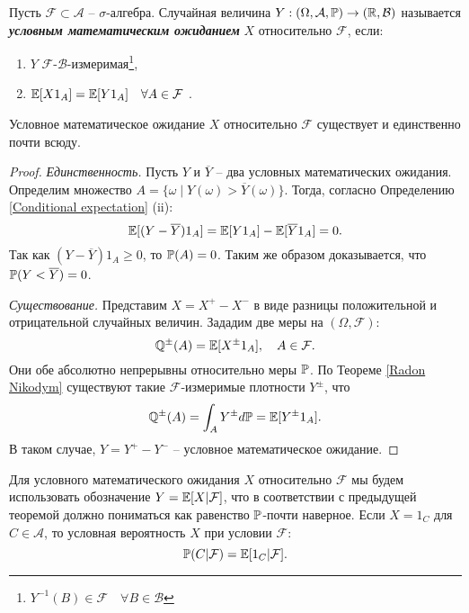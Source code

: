 \begin{defn}\label{Conditional expectation}
	Пусть $\mathcal{F} \subset \mathcal{A}$ -- $\sigma$-алгебра. Случайная величина $Y: (\Omega, \mathcal{A}, \mathbb{P}) \rightarrow (\mathbb{R}, \mathcal{B})$ называется \textbf{\textit{условным математическим ожиданием}} $X$ относительно $\mathcal{F}$, если:
	\begin{enumerate}
		\item $Y$ $\mathcal{F}$-$\mathcal{B}$-измеримая\footnote{$Y^{-1}(B) \in \mathcal{F} \quad \forall B \in \mathcal{B}$},
		\item $\mathbb{E}[X 1_{A}]=\mathbb{E}[Y 1_{A}] \quad \forall A \in \mathcal{F}$ .
	\end{enumerate}
\end{defn}

\begin{thm}\label{Existence and uniqueness of expectation}
	Условное математическое ожидание $X$ относительно $\mathcal{F}$ существует и единственно почти всюду.
\end{thm}

\begin{proof}
	\textit{Единственность.} Пусть $Y$ и $\overline{Y}$ -- два условных математических ожидания. Определим множество $A=\{\omega \mid Y(\omega) > \overline{Y}({\omega}) \}$. Тогда, согласно Определению \ref{Conditional expectation} (ii):
	\[\mathbb{E}[(Y-\overline{Y})1_A]=\mathbb{E}[Y1_A]-\mathbb{E}[\overline{Y}1_A]=0.   \]
	Так как $(Y-\overline{Y})1_A \geq 0$, то $\mathbb{P}(A)=0$. Таким же образом доказывается, что $\mathbb{P}(Y<\overline{Y})=0$.
	
	\textit{Существование.} Представим $X=X^+-X^-$ в виде разницы положительной и отрицательной случайных величин. Зададим две меры на $(\Omega, \mathcal{F})$:
	\[\mathbb{Q}^{\pm}(A)=\mathbb{E}[X^\pm 1_A],  \quad A \in \mathcal{F}.\]
	Они обе абсолютно непрерывны относительно меры $\mathbb{P}$. По Теореме \ref{Radon Nikodym} существуют такие $\mathcal{F}$-измеримые плотности $Y^\pm$, что
	\[\mathbb{Q}^{\pm}(A)=\int_A Y^\pm d\mathbb{P} = \mathbb{E}[Y^\pm 1_A].\]
	В таком случае, $Y = Y^+-Y^-$ -- условное математическое ожидание.	
\end{proof}

\begin{rmrk}
	Для условного математического ожидания $X$ относительно $\mathcal{F}$ мы будем использовать обозначение $Y=\mathbb{E}[X | \mathcal{F}]$, что в соответствии с предыдущей теоремой должно пониматься как равенство $\mathbb{P}$-почти наверное. Если $X=1_C$ для $C \in \mathcal{A}$, то условная вероятность $X$ при условии $\mathcal{F}$:
	\[\mathbb{P}(C|\mathcal{F})=\mathbb{E}[1_C|\mathcal{F}].\]
\end{rmrk}

